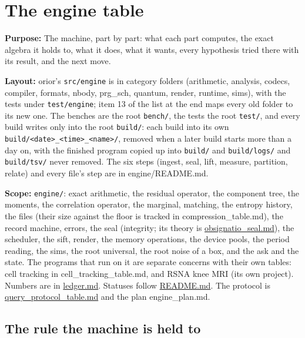 \chapter{\texorpdfstring{The engine table}{The engine table}}
\label{chap:engine-table}

\textbf{Purpose:} The machine, part by part: what each part computes, the exact algebra it holds to, what it does, what it wants, every hypothesis tried there with its result, and the next move.

\textbf{Layout:} orior's \texttt{src/\allowbreak{}engine} is in category folders (arithmetic, analysis, codecs, compiler, formats, nbody, prg\_\allowbreak{}sch, quantum, render, runtime, sims), with the tests under \texttt{test/\allowbreak{}engine}; item 13 of the list at the end maps every old folder to its new one. The benches are the root \texttt{bench/\allowbreak{}}, the tests the root \texttt{test/\allowbreak{}}, and every build writes only into the root \texttt{build/\allowbreak{}}: each build into its own \texttt{build/\allowbreak{}<date>\_\allowbreak{}<time>\_\allowbreak{}<name>/\allowbreak{}}, removed when a later build starts more than a day on, with the finished program copied up into \texttt{build/\allowbreak{}} and \texttt{build/\allowbreak{}logs/\allowbreak{}} and \texttt{build/\allowbreak{}tsv/\allowbreak{}} never removed. The six steps (ingest, seal, lift, measure, partition, relate) and every file's step are in engine/README.md.

\textbf{Scope:} \texttt{engine/\allowbreak{}}: exact arithmetic, the residual operator, the component tree, the moments, the correlation operator, the marginal, matching, the entropy history, the files (their size against the floor is tracked in compression\_\allowbreak{}table.md), the record machine, errors, the seal (integrity; its theory is \hyperref[chap:obsignatio-seal]{obsignatio\_\allowbreak{}seal.md}), the scheduler, the sift, render, the memory operations, the device pools, the period reading, the sims, the root universal, the root noise of a box, and the ask and the state. The programs that run on it are separate concerns with their own tables: cell tracking in cell\_\allowbreak{}tracking\_\allowbreak{}table.md, and RSNA knee MRI (its own project). Numbers are in \hyperref[chap:ledger]{ledger.md}. Statuses follow \hyperref[chap:readme]{README.md}. The protocol is \hyperref[chap:query-protocol-table]{query\_\allowbreak{}protocol\_\allowbreak{}table.md} and the plan engine\_\allowbreak{}plan.md.

\section{\texorpdfstring{The rule the machine is held to}{The rule the machine is held to}}

